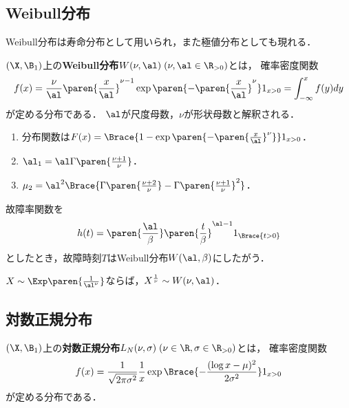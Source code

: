 \documentclass[uplatex,dvipdfmx]{jsreport}
\begin{document}
\subsection{Weibull分布}

\begin{tcolorbox}[colframe=ForestGreen, colback=ForestGreen!10!white,breakable,colbacktitle=ForestGreen!40!white,coltitle=black,fonttitle=\bfseries\sffamily,
title=]
    Weibull分布は寿命分布として用いられ，また極値分布としても現れる．
\end{tcolorbox}

\begin{definition}
    $(\X,\B_1)$上の\textbf{Weibull分布}$W(\nu,\al)\;(\nu,\al\in\R_{>0})$とは，
    確率密度関数
    \[f(x)=\frac{\nu}{\al}\paren{\frac{x}{\al}}^{\nu-1}\exp\paren{-\paren{\frac{x}{\al}}^\nu}1_{x>0}=\int^x_{-\infty}f(y)dy\]
    が定める分布である．
    $\al$が尺度母数，$\nu$が形状母数と解釈される．
\end{definition}

\begin{proposition}\mbox{}
    \begin{enumerate}
        \item 分布関数は$F(x)=\Brace{1-\exp\paren{-\paren{\frac{x}{\al}}^\nu}}1_{x>0}$．
        \item $\al_1=\al\Gamma\paren{\frac{\nu+1}{\nu}}$．
        \item $\mu_2=\al^2\Brace{\Gamma\paren{\frac{\nu+2}{\nu}}-\Gamma\paren{\frac{\nu+1}{\nu}}^2}$．
    \end{enumerate}
\end{proposition}

\begin{proposition}
    故障率関数を
    \[h(t)=\paren{\frac{\al}{\beta}}\paren{\frac{t}{\beta}}^{\al-1}1_{\Brace{t>0}}\]
    としたとき，故障時刻$T$はWeibull分布$W(\al,\beta)$にしたがう．
\end{proposition}

\begin{proposition}
    $X\sim\Exp\paren{\frac{1}{\al^\nu}}$ならば，$X^{\frac{1}{\nu}}\sim W(\nu,\al)$．
\end{proposition}

\subsection{対数正規分布}

\begin{definition}
    $(\X,\B_1)$上の\textbf{対数正規分布}$L_N(\nu,\sigma)\;(\nu\in\R,\sigma\in\R_{>0})$とは，
    確率密度関数
    \[f(x)=\frac{1}{\sqrt{2\pi\sigma^2}}\frac{1}{x}\exp\Brace{-\frac{(\log x-\mu)^2}{2\sigma^2}}1_{x>0}\]
    が定める分布である．
\end{definition}
\end{document}
